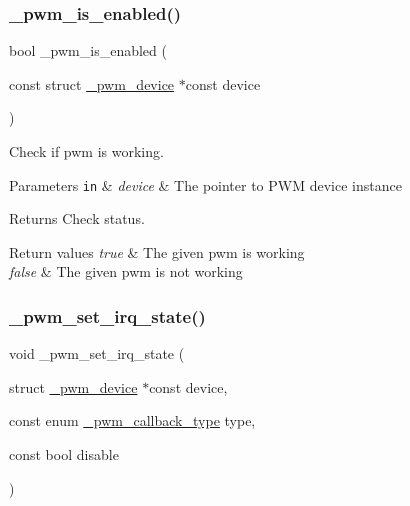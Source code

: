 \subsubsection{\texorpdfstring{\+\_\+pwm\+\_\+is\+\_\+enabled()}{\_pwm\_is\_enabled()}}
{\footnotesize\ttfamily bool \+\_\+pwm\+\_\+is\+\_\+enabled (\begin{DoxyParamCaption}\item[{const struct \hyperlink{struct__pwm__device}{\+\_\+pwm\+\_\+device} $\ast$const}]{device }\end{DoxyParamCaption})}



Check if pwm is working. 


\begin{DoxyParams}[1]{Parameters}
\mbox{\tt in}  & {\em device} & The pointer to P\+WM device instance\\
\hline
\end{DoxyParams}
\begin{DoxyReturn}{Returns}
Check status. 
\end{DoxyReturn}

\begin{DoxyRetVals}{Return values}
{\em true} & The given pwm is working \\
\hline
{\em false} & The given pwm is not working \\
\hline
\end{DoxyRetVals}
\mbox{\label{group___h_p_l_ga583710860d0b672db85bada1acc07dc4}} 
\subsubsection{\texorpdfstring{\+\_\+pwm\+\_\+set\+\_\+irq\+\_\+state()}{\_pwm\_set\_irq\_state()}}
{\footnotesize\ttfamily void \+\_\+pwm\+\_\+set\+\_\+irq\+\_\+state (\begin{DoxyParamCaption}\item[{struct \hyperlink{struct__pwm__device}{\+\_\+pwm\+\_\+device} $\ast$const}]{device,  }\item[{const enum \hyperlink{group___h_p_l_gaa279abe5a858ccbaea89be01192a2d6c}{\+\_\+pwm\+\_\+callback\+\_\+type}}]{type,  }\item[{const bool}]{disable }\end{DoxyParamCaption})}



